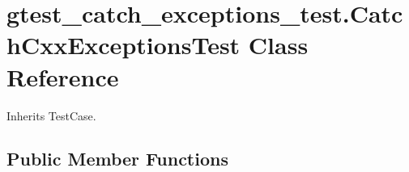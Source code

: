 \hypertarget{classgtest__catch__exceptions__test_1_1CatchCxxExceptionsTest}{}\section{gtest\+\_\+catch\+\_\+exceptions\+\_\+test.\+Catch\+Cxx\+Exceptions\+Test Class Reference}
\label{classgtest__catch__exceptions__test_1_1CatchCxxExceptionsTest}


Inherits Test\+Case.

\subsection*{Public Member Functions}
